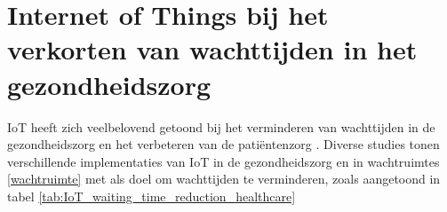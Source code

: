 
\section{Internet of Things bij het verkorten van wachttijden in het gezondheidszorg}
IoT heeft zich veelbelovend getoond bij het verminderen van wachttijden in de gezondheidszorg en het verbeteren van de patiëntenzorg \autocite{Bhatt2017}. Diverse studies tonen verschillende implementaties van IoT in de gezondheidszorg en in wachtruimtes \ref{wachtruimte} met als doel om wachttijden te verminderen, zoals aangetoond in tabel \ref{tab:IoT_waiting_time_reduction_healthcare} 


